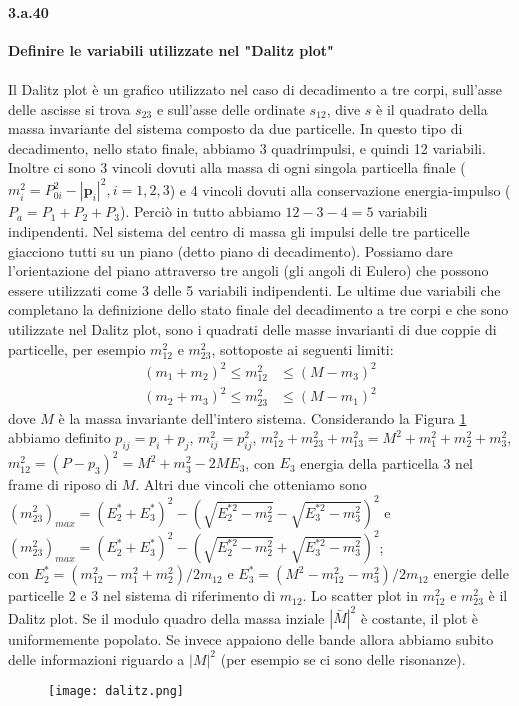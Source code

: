 \documentclass[twoside]{article}
\begin{document}
\paragraph{3.a.40}\textbf{Definire le variabili utilizzate nel "Dalitz plot"}\\
\\
Il Dalitz plot è un grafico utilizzato nel caso di decadimento a tre corpi, sull'asse delle ascisse si trova $s_{23}$ e sull'asse delle ordinate $s_{12}$, dive $s$ è il quadrato della massa invariante del sistema composto da due particelle. In questo tipo di decadimento, nello stato finale, abbiamo 3 quadrimpulsi, e quindi 12 variabili. Inoltre ci sono 3 vincoli dovuti alla massa di ogni singola particella finale ($m_i^2=P_{0i}^2-|\mathbf{p}_i|^2 , i=1,2,3$) e 4 vincoli dovuti alla conservazione energia-impulso ($P_a=P_1+P_2+P_3$). Perciò in tutto abbiamo $12-3-4=5$ variabili indipendenti. Nel sistema del centro di massa gli impulsi delle tre particelle giacciono tutti su un piano (detto piano di decadimento). Possiamo dare l'orientazione del piano attraverso tre angoli (gli angoli di Eulero) che possono essere utilizzati come 3 delle 5 variabili indipendenti. Le ultime due variabili che completano la definizione dello stato finale del decadimento a tre corpi e che sono utilizzate nel Dalitz plot, sono i quadrati delle masse invarianti di due coppie di particelle, per esempio $m_{12}^2$ e $m_{23}^2$, sottoposte ai seguenti limiti:
\begin{align}
(m_1+m_2)^2 \leq m_{12}^2 &\leq (M-m_3)^2  \\
(m_2+m_3)^2 \leq m_{23}^2 &\leq (M-m_1)^2
\end{align}
dove $M$ è la massa invariante dell'intero sistema. Considerando la Figura \ref{fig:dalitz} abbiamo definito $p_{ij}=p_i+p_j$, $m_{ij}^2=p_{ij}^2$, $m_{12}^2+m_{23}^2+m_{13}^2 = M^2+m_1^2+m_2^2+m_3^2$, $m_{12}^2=\left( P-p_3 \right)^2 = M^2 +m_3^2 -2ME_3$, con $E_3$ energia della particella 3 nel frame di riposo di $M$. Altri due vincoli che otteniamo sono $\left(m_{23}^2\right)_{max}= \left(E_2^* + E_3^* \right)^2-\left(\sqrt{E_{2}^{*2}-m_2^2} - \sqrt{E_3^{*2}-m_3^2}\right)^2$ e $\left(m_{23}^2\right)_{max}= \left(E_2^* + E_3^* \right)^2-\left(\sqrt{E_{2}^{*2}-m_2^2} + \sqrt{E_3^{*2}-m_3^2}\right)^2$;\\ con $E_2^* = \left(m_{12}^2-m_1^2+m_2^2\right)/2m_{12}$ e $E_3^* = \left(M^2-m_{12}^2-m_3^2\right)/2m_{12}$ energie delle particelle 2 e 3 nel sistema di riferimento di $m_{12}$. Lo scatter plot in $m_{12}^2$ e $m_{23}^2$ è il Dalitz plot. Se il modulo quadro della massa inziale $|\bar{M}|^2$ è costante, il plot è uniformemente popolato. Se invece appaiono delle bande allora abbiamo subito delle informazioni riguardo a $|M|^2$ (per esempio se ci sono delle risonanze).
\begin{figure}[H]
    \centering
    \texttt{[image: dalitz.png]}
    \label{fig:dalitz}
\end{figure}
\end{document}
